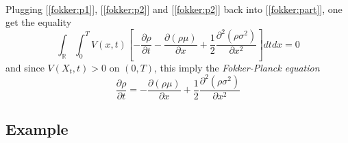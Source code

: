 \documentclass{article}
\begin{document}
\paragraph{} Plugging [\ref{fokker:p1}], [\ref{fokker:p2}] and [\ref{fokker:p2}] back into [\ref{fokker:part}], one get the equality
%
\begin{equation}
\int_\mathbb R\int^T_0 V(x, t)\left[-\frac{\partial \rho}{\partial t}-\frac{\partial (\rho\mu)}{\partial x}+\frac{1}{2}\frac{\partial^2(\rho\sigma^2)}{\partial x^2}\right]dtdx = 0
\end{equation}
%
and since $V(X_t, t)> 0$ on $(0, T)$, this imply the \emph{Fokker-Planck equation}
%
\begin{equation}
\frac{\partial\rho}{\partial t} = -\frac{\partial(\rho\mu)}{\partial x} + \frac{1}{2}\frac{\partial^2 (\rho\sigma^2)}{\partial x^2}
\end{equation}
%
\subsection{Example}
%
\end{document}

